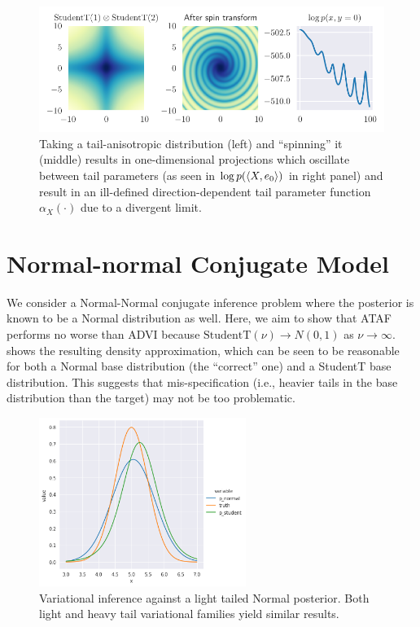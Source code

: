 \documentclass[thesis.tex]{subfiles}
\begin{document}
\begin{figure}[htbp]
    \centering
    \vspace{-.5in}
    \includegraphics[scale=0.8]{../Figures/spiral.pdf}
    \caption{Taking a tail-anisotropic distribution (left) and ``spinning'' it (middle) results in
        one-dimensional projections which oscillate between tail parameters (as seen in
        $\log p(\braket{X,e_0})$ in right panel) and result in an ill-defined
        direction-dependent tail parameter function $\alpha_X(\cdot)$ due to a
        divergent limit.
    }
    \label{fig:spiral}
\end{figure}


\section{Normal-normal Conjugate Model}
\label{sec:normal-normal-location-mixture}

We consider a Normal-Normal conjugate inference problem where the posterior
is known to be a Normal distribution as well. Here, we aim to show that ATAF
performs no worse than ADVI because $\text{StudentT}(\nu) \to N(0, 1)$ as $\nu \to \infty$.
 shows the resulting density approximation, which can
be seen to be reasonable for both a Normal base distribution (the ``correct'' one)
and a StudentT base distribution. This suggests that mis-specification (i.e., heavier
tails in the base distribution than the target) may not be too problematic.

\begin{figure}[H]
  \centering
  \includegraphics[width=0.6\textwidth]{../Figures/normal_normal_posterior.png}
  \caption{Variational inference against a light tailed Normal posterior. Both light and heavy tail
  variational families yield similar results.}
  \label{fig:normal_normal}
\end{figure}
\end{document}
